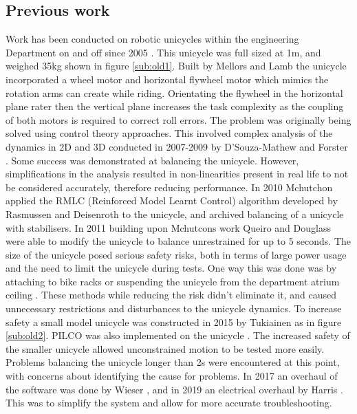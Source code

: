 \documentclass[twoside,twocolumn,12pt]{article}
\begin{document}
\subsection{Previous work}
Work has been conducted on robotic unicycles within the engineering Department on and off since 2005 \cite{original}. This unicycle was full sized at 1m, and weighed 35kg shown in figure \ref{sub:old1}. Built by Mellors and Lamb the unicycle incorporated a wheel motor and horizontal flywheel motor which mimics the rotation arms can create while riding. Orientating the flywheel in the horizontal plane  rater then the vertical plane increases the task complexity as the coupling of both motors is required to correct roll errors.
\newline
The problem was originally being solved using control theory approaches. This involved complex analysis of the dynamics in 2D and 3D conducted in 2007-2009 by D'Souza-Mathew \cite{neil} and Forster  \cite{forster}. Some success was demonstrated at balancing the unicycle. However, simplifications in the analysis resulted in non-linearities present in real life to not be considered accurately, therefore reducing performance.
\newline
In 2010 Mchutchon \cite{mchut} applied the RMLC (Reinforced Model Learnt Control) algorithm developed by Rasmussen and Deisenroth to the unicycle, and archived balancing of a unicycle with stabilisers. In 2011 building upon Mchutcons work Queiro \cite{roderigo} and Douglass \cite{douglass} were able to modify the unicycle to balance unrestrained for up to 5 seconds. 
\newline
The size of the unicycle posed serious safety risks, both in terms of large power usage and the need to limit the unicycle during tests. One way this was done was by attaching to bike racks \cite{neil} or suspending the unicycle from the department atrium ceiling \cite{roderigo}. These methods while reducing the risk didn't eliminate it, and caused unnecessary restrictions and disturbances to the unicycle dynamics. 
\newline
To increase safety a small model unicycle was constructed in 2015 by Tukiainen \cite{tuk} as in figure \ref{sub:old2}. PILCO was also implemented on the unicycle \cite{pilco}. The increased safety of the smaller unicycle allowed unconstrained motion to be tested more easily. Problems balancing the unicycle longer than 2s were encountered at this point, with concerns about identifying the cause for problems. In 2017 an overhaul of the software was done by Wieser \cite{eric}, and in 2019 an electrical overhaul by Harris \cite{arsalan}. This was to simplify the system and allow for more accurate troubleshooting. 
\end{document}

